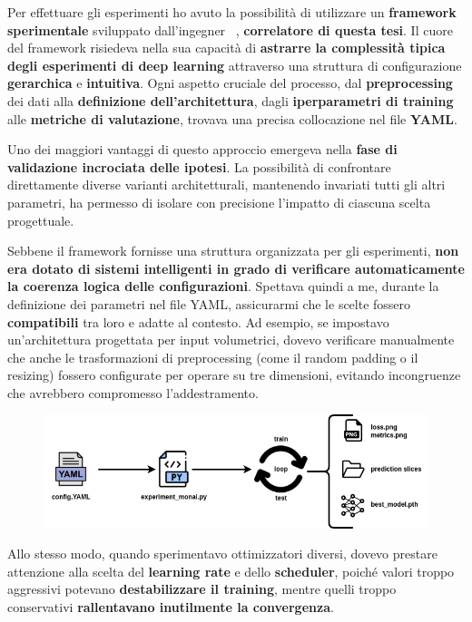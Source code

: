 
Per effettuare gli esperimenti ho avuto la possibilità di utilizzare un \textbf{framework sperimentale} sviluppato dall'ingegner  ~\cite{MarcoCantone}, \textbf{correlatore di questa tesi}. Il cuore del framework risiedeva nella sua capacità di \textbf{astrarre la complessità tipica degli esperimenti di deep learning} attraverso una struttura di configurazione \textbf{gerarchica} e \textbf{intuitiva}. Ogni aspetto cruciale del processo, dal \textbf{preprocessing} dei dati alla \textbf{definizione dell'architettura}, dagli \textbf{iperparametri di training} alle \textbf{metriche di valutazione}, trovava una precisa collocazione nel file \textbf{YAML}.

Uno dei maggiori vantaggi di questo approccio emergeva nella \textbf{fase di validazione incrociata delle ipotesi}. La possibilità di confrontare direttamente diverse varianti architetturali, mantenendo invariati tutti gli altri parametri, ha permesso di isolare con precisione l'impatto di ciascuna scelta progettuale.


Sebbene il framework fornisse una struttura organizzata per gli esperimenti, \textbf{non era dotato di sistemi intelligenti in grado di verificare automaticamente la coerenza logica delle configurazioni}. Spettava quindi a me, durante la definizione dei parametri nel file YAML, assicurarmi che le scelte fossero \textbf{compatibili} tra loro e adatte al contesto. Ad esempio, se impostavo un'architettura progettata per input volumetrici, dovevo verificare manualmente che anche le trasformazioni di preprocessing (come il random padding o il resizing) fossero configurate per operare su tre dimensioni, evitando incongruenze che avrebbero compromesso l'addestramento. 

\begin{figure}[H]
  \centering
  \includegraphics[width=\textwidth]{figures/Untitled Diagram.drawio.png}
\end{figure}


Allo stesso modo, quando sperimentavo ottimizzatori diversi, dovevo prestare attenzione alla scelta del \textbf{learning rate} e dello \textbf{scheduler}, poiché valori troppo aggressivi potevano \textbf{destabilizzare il training}, mentre quelli troppo conservativi \textbf{rallentavano inutilmente la convergenza}. 

